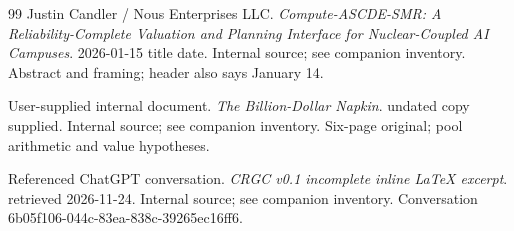 \documentclass[11pt,letterpaper]{article}
\begin{document}
\begin{thebibliography}{99}
 Justin Candler / Nous Enterprises LLC. \emph{Compute-ASCDE-SMR: A Reliability-Complete Valuation and Planning Interface for Nuclear-Coupled AI Campuses}. 2026-01-15 title date. Internal source; see companion inventory. Abstract and framing; header also says January 14.

 User-supplied internal document. \emph{The Billion-Dollar Napkin}. undated copy supplied. Internal source; see companion inventory. Six-page original; pool arithmetic and value hypotheses.

 Referenced ChatGPT conversation. \emph{CRGC v0.1 incomplete inline LaTeX excerpt}. retrieved 2026-11-24. Internal source; see companion inventory. Conversation 6b05f106-044c-83ea-838c-39265ec16ff6.

\end{thebibliography}
\end{document}
